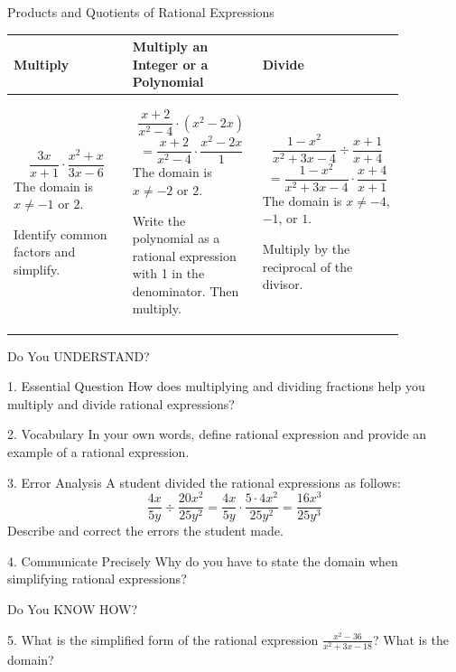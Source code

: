 \documentclass{article}
\newenvironment{concept-summary}{}{}    %
\newcommand{\answer}[1]{}               %
\begin{document}
\begin{concept-summary}
Products and Quotients of Rational Expressions

\begin{tabular}{p{0.28\linewidth}p{0.30\linewidth}p{0.28\linewidth}}
\toprule
Multiply & Multiply an Integer or a Polynomial & Divide \\
\midrule
\[
\frac{3x}{x+1}\cdot\frac{x^2+x}{3x-6}
\]
The domain is \(x\ne -1\) or \(2\).

Identify common factors and simplify.
&
\[
\frac{x+2}{x^2-4}\cdot(x^2-2x)
\]
\[
=\frac{x+2}{x^2-4}\cdot\frac{x^2-2x}{1}
\]
The domain is \(x\ne -2\) or \(2\).

Write the polynomial as a rational expression with 1 in the denominator. Then multiply.
&
\[
\frac{1-x^2}{x^2+3x-4}\div\frac{x+1}{x+4}
\]
\[
=\frac{1-x^2}{x^2+3x-4}\cdot\frac{x+4}{x+1}
\]
The domain is \(x\ne -4\), \(-1\), or \(1\).

Multiply by the reciprocal of the divisor.
\\
\bottomrule
\end{tabular}

Do You UNDERSTAND?

1. Essential Question How does multiplying and dividing fractions help you multiply and divide rational expressions?
\answer{The steps and operations used to multiply and divide rational expressions are similar to those used with fractions.}

2. Vocabulary In your own words, define rational expression and provide an example of a rational expression.
\answer{A rational expression is the ratio of two polynomials that has a domain of all real numbers except those for which the denominator equals zero; Sample: \(\frac{3x^2+6x}{9x}\).}

3. Error Analysis A student divided the rational expressions as follows:
\[
\frac{4x}{5y}\div\frac{20x^2}{25y^2}
=
\frac{4x}{5y}\cdot\frac{5\cdot 4x^2}{25y^2}
=
\frac{16x^3}{25y^3}
\]
Describe and correct the errors the student made.
\answer{The student was supposed to multiply by the reciprocal. The student also did not place any restrictions on the domain. The rational expression should be \(\frac{y}{x}\), \(x\ne0\), \(y\ne0\).}

4. Communicate Precisely Why do you have to state the domain when simplifying rational expressions?
\answer{When the denominator equals 0, fractions are undefined.}

Do You KNOW HOW?

5. What is the simplified form of the rational expression \(\frac{x^2-36}{x^2+3x-18}\)? What is the domain?
\answer{\(\frac{x-6}{x-3}\) for all \(x\) except \(-6\) and \(3\).}


\end{concept-summary}
\end{document}
